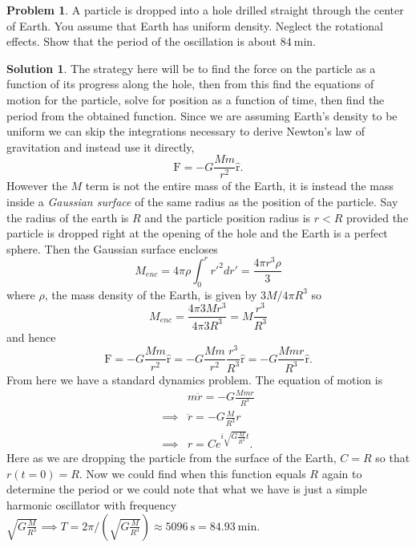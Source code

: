 \documentclass[10pt]{article}
\theoremstyle{definition}
\newtheorem{problem}{Problem}
\newtheorem{soln}{Solution}
\newcommand{\uv}[1]{\hat{\bv{{#1}}}}
\newcommand{\bv}[1]{\bm{\mathrm{#1}}}
\begin{document}
\begin{problem}
A particle is dropped into a hole drilled straight through the center of Earth. You assume that
Earth has uniform density. Neglect the rotational effects. Show that the period of the oscillation
is about $\qty{84}{\minute}$.
\end{problem}
\begin{soln}
  The strategy here will be to find the force on the particle as a function of its progress along the hole, then from this find the equations of motion for the particle, solve for
  position as a function of time, then find the period from the obtained function. Since we are assuming Earth's density to be uniform
  we can skip the integrations necessary to derive Newton's law of gravitation and instead use it directly,
  $$\bv{F}=-G\frac{Mm}{r^2}\uv{r}.$$
  However the $M$ term is not the entire mass of the Earth, it is instead the mass inside a \emph{Gaussian surface} of the same radius as the position of the particle.
  Say the radius of the earth is $R$ and the particle position radius is $r<R$ provided the particle is dropped right at the opening of the hole and the Earth is a perfect sphere.
  Then the Gaussian surface encloses $$M_{enc}=4\pi \rho\int_{0}^{r}r'^2dr'=\frac{4\pi r^3\rho}{3}$$
  where $\rho$, the mass density of the Earth, is given by $3M/4\pi R^3$ so $$M_{enc}=\frac{4\pi 3M r^3}{4\pi 3R^3}=M\frac{r^3}{R^3}$$
  and hence
  $$\bv{F}=-G\frac{Mm}{r^2}\uv{r}=-G\frac{Mm}{r^2}\frac{r^3}{R^3}\uv{r}=-G\frac{Mm r}{R^3}\uv{r}.$$
  From here we have a standard dynamics problem. The equation of motion is
  \begin{align*}
             & m\ddot{r}=-G\frac{Mm r}{R^3}    \\
    \implies & \ddot{r}=-G\frac{M}{R^3}r       \\
    \implies & r=Ce^{i\sqrt{G\frac{M}{R^3}}t}.
  \end{align*}
  Here as we are dropping the particle from the surface of the Earth, $C=R$ so that $r(t=0)=R$. Now we could find when this function equals $R$ again to determine the period or we could
  note that what we have is just a simple harmonic oscillator with frequency $\sqrt{G\frac{M}{R^3}}\implies T=2\pi/(\sqrt{G\frac{M}{R^3}})\approx\qty{5096}{\second}=\qty{84.93}{\minute}$.
\end{soln}
\end{document}
